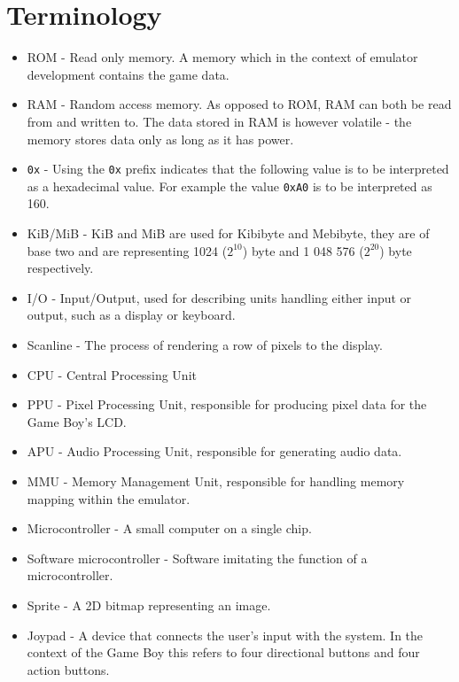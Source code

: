 \chapter*{Terminology}
\thispagestyle{plain}			%

\begin{itemize}
    \item ROM - Read only memory. A memory which in the context of emulator development contains the game data.
    \item RAM - Random access memory. As opposed to ROM, RAM can both be read from and written to. The data stored in RAM is however volatile - the memory stores data only as long as it has power.
    \item \texttt{0x} - Using the \texttt{0x} prefix indicates that the following value is to be interpreted as a hexadecimal value. For example the value \texttt{0xA0} is to be interpreted as 160.
    \item KiB/MiB - KiB and MiB are used for Kibibyte and Mebibyte, they are of base two and are representing  1024 ($2^{10}$) byte and 1 048 576 ($2^{20}$) byte respectively.
    \item I/O - Input/Output, used for describing units handling either input or output, such as a display or keyboard.
    \item Scanline - The process of rendering a row of pixels to the display.
    \item CPU - Central Processing Unit 
    \item PPU - Pixel Processing Unit, responsible for producing pixel data for the Game Boy's LCD.
    \item APU - Audio Processing Unit, responsible for generating audio data.
    \item MMU - Memory Management Unit, responsible for handling memory mapping within the emulator.
    \item Microcontroller - A small computer on a single chip.
    \item Software microcontroller - Software imitating the function of a microcontroller.
    \item Sprite - A 2D bitmap representing an image.
    \item Joypad - A device that connects the user's input with the system. In the context of the Game Boy this refers to four directional buttons and four action buttons.
\end{itemize}

\newpage				%
\thispagestyle{plain}
